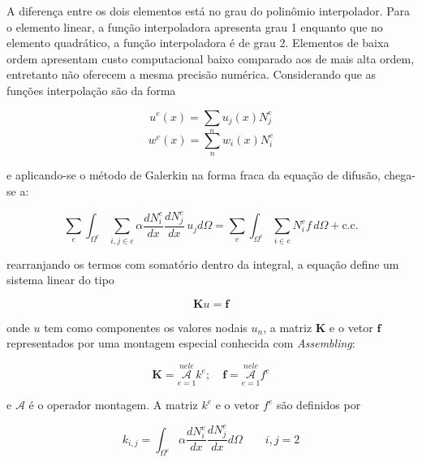 A diferença entre os dois elementos está no grau do polinômio
interpolador.  Para o elemento linear, a função interpoladora apresenta
grau 1 enquanto que no elemento quadrático, a função interpoladora é de
grau 2. Elementos de baixa ordem apresentam custo computacional baixo
comparado aos de mais alta ordem, entretanto não oferecem a mesma
precisão numérica. Considerando que as funções interpolação são da forma

\begin{equation}
	u^e(x) 
	= 
	\sum_n u_j(x) N^e_j
\end{equation}\hspace{0.5cm}
\begin{equation}
	w^e(x) 
	= 
	\sum_n w_i(x) N^e_i
\end{equation}\hspace{0.5cm}

\noindent e aplicando-se o método de Galerkin na forma fraca da equação 
de difusão, chega-se a:

\begin{equation}
	\sum_e \int_{\Omega^e} \sum_{i,j \in e} \alpha \frac{dN^e_i}{dx}
	\frac{dN^e_j}{dx} \, u_j d\Omega  
	=
	\sum_e \int_{\Omega^e} \sum_{i \in e} N_i^e f \, d\Omega + \text{c.c.} 
\label{eq:galerkin1D}
\end{equation}\hspace{0.5cm}

\noindent rearranjando os termos com somatório dentro da integral, a
equação define um sistema linear do tipo

\begin{equation}
	\mathbf{K}u = \mathbf{f} 
	\label{eq:sistemalinear}
\end{equation}\hspace{0.5cm}

\noindent onde $u$ tem como componentes os valores nodais $u_n$, a
matriz $\mathbf{K}$ e o vetor $\mathbf{f}$ representados por uma
montagem especial conhecida com \emph{Assembling}:

\begin{equation}
	\mathbf{K} = \overset{nele}{\underset{e=1}{\mathcal{A}}} k^e; \quad
	\mathbf{f} = \overset{nele}{\underset{e=1}{\mathcal{A}}} f^e
\end{equation}

\noindent e $\mathcal{A}$ é o operador montagem. A matriz $k^e$ e o vetor $f^e$
são definidos por

\begin{equation}
	k_{i,j} = \int_{\Omega^e}\alpha \frac{dN_i^e}{dx} \frac{dN_j^e}{dx}
	d\Omega
	\qquad
	i,j=2
\end{equation}\hspace{0.5cm}

